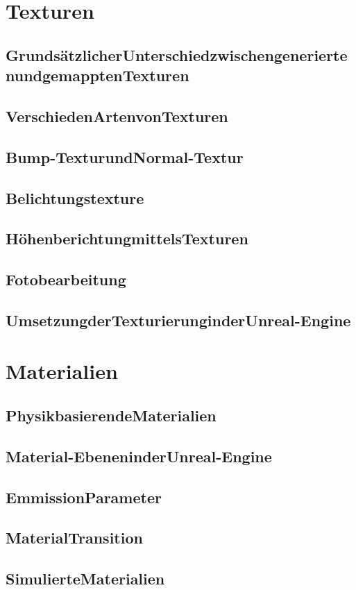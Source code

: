 \section{Texturen}
\subsection{GrundsätzlicherUnterschiedzwischengeneriertenundgemapptenTexturen}
\subsection{VerschiedenArtenvonTexturen}

\subsection{Bump-TexturundNormal-Textur}
\label{texturierung:bnTex}

\subsection{Belichtungstexture}
\subsection{HöhenberichtungmittelsTexturen}
\subsection{Fotobearbeitung}
\subsection{UmsetzungderTexturierunginderUnreal-Engine}

\section{Materialien}
\subsection{PhysikbasierendeMaterialien}
\subsection{Material-EbeneninderUnreal-Engine}
\subsection{EmmissionParameter}
\subsection{MaterialTransition}
\subsection{SimulierteMaterialien}
